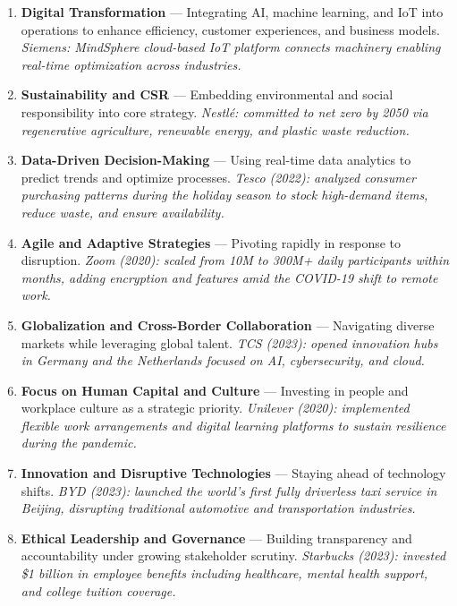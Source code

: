 \documentclass[11pt, letterpaper]{article}
\begin{document}
\begin{enumerate}[leftmargin=*, label=\textbf{\arabic*.}]
  \item \textbf{Digital Transformation} --- Integrating AI, machine learning, and IoT into operations to enhance efficiency, customer experiences, and business models. \textit{Siemens: MindSphere cloud-based IoT platform connects machinery enabling real-time optimization across industries.}
  \item \textbf{Sustainability and CSR} --- Embedding environmental and social responsibility into core strategy. \textit{Nestlé: committed to net zero by 2050 via regenerative agriculture, renewable energy, and plastic waste reduction.}
  \item \textbf{Data-Driven Decision-Making} --- Using real-time data analytics to predict trends and optimize processes. \textit{Tesco (2022): analyzed consumer purchasing patterns during the holiday season to stock high-demand items, reduce waste, and ensure availability.}
  \item \textbf{Agile and Adaptive Strategies} --- Pivoting rapidly in response to disruption. \textit{Zoom (2020): scaled from 10M to 300M+ daily participants within months, adding encryption and features amid the COVID-19 shift to remote work.}
  \item \textbf{Globalization and Cross-Border Collaboration} --- Navigating diverse markets while leveraging global talent. \textit{TCS (2023): opened innovation hubs in Germany and the Netherlands focused on AI, cybersecurity, and cloud.}
  \item \textbf{Focus on Human Capital and Culture} --- Investing in people and workplace culture as a strategic priority. \textit{Unilever (2020): implemented flexible work arrangements and digital learning platforms to sustain resilience during the pandemic.}
  \item \textbf{Innovation and Disruptive Technologies} --- Staying ahead of technology shifts. \textit{BYD (2023): launched the world's first fully driverless taxi service in Beijing, disrupting traditional automotive and transportation industries.}
  \item \textbf{Ethical Leadership and Governance} --- Building transparency and accountability under growing stakeholder scrutiny. \textit{Starbucks (2023): invested \$1 billion in employee benefits including healthcare, mental health support, and college tuition coverage.}
\end{enumerate}

\newpage
\end{document}
